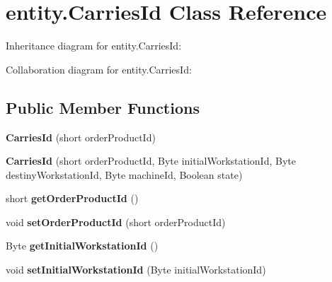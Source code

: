 \hypertarget{classentity_1_1_carries_id}{}\section{entity.\+Carries\+Id Class Reference}
\label{classentity_1_1_carries_id}


Inheritance diagram for entity.\+Carries\+Id\+:


Collaboration diagram for entity.\+Carries\+Id\+:
\subsection*{Public Member Functions}
\begin{DoxyCompactItemize}
\item 
\mbox{\label{classentity_1_1_carries_id_ac64966f7b08cb278d2e51d091fb8a304}} 
{\bfseries Carries\+Id} (short order\+Product\+Id)
\item 
\mbox{\label{classentity_1_1_carries_id_a9197dd375f753406cbc7ad18046736aa}} 
{\bfseries Carries\+Id} (short order\+Product\+Id, Byte initial\+Workstation\+Id, Byte destiny\+Workstation\+Id, Byte machine\+Id, Boolean state)
\item 
\mbox{\label{classentity_1_1_carries_id_ad4b7aae7d5280f004806e4dc1516e3ab}} 
short {\bfseries get\+Order\+Product\+Id} ()
\item 
\mbox{\label{classentity_1_1_carries_id_a40a92d23919aef1434dadffb0bf185d5}} 
void {\bfseries set\+Order\+Product\+Id} (short order\+Product\+Id)
\item 
\mbox{\label{classentity_1_1_carries_id_a9f0d4a30dbe0db09bab463393bd6d1f5}} 
Byte {\bfseries get\+Initial\+Workstation\+Id} ()
\item 
\mbox{\label{classentity_1_1_carries_id_a2f055c85f701e12e2d93e054189414c6}} 
void {\bfseries set\+Initial\+Workstation\+Id} (Byte initial\+Workstation\+Id)
\item 
\mbox{\label{classentity_1_1_carries_id_a6806d0507a1e0e67cc2cb3668255a1b8}} 

\end{DoxyCompactItemize}
